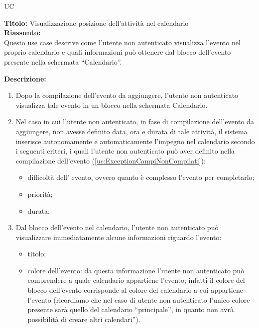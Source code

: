 \begin{listaPersonale}{UC}
    \begin{listaPersonale2} [UC] {}
        \textbf{Titolo:} Visualizzazione posizione dell'attività nel calendario \\
        \textbf{Riassunto: } \\
        Questo use case descrive come l'utente non autenticato visualizza l'evento nel proprio calendario e quali informazioni può ottenere dal blocco dell'evento presente nella schermata “Calendario”.

        \textbf{Descrizione: }
        \begin{enumerate}
            \item Dopo la compilazione dell'evento da aggiungere, l'utente non autenticato visualizza tale evento in un blocco nella schermata Calendario.
            \item Nel caso in cui l'utente non autenticato, in fase di compilazione dell'evento da aggiungere, non avesse definito data, ora e durata di tale attività, il sistema inserisce autonomamente e automaticamente l'impegno nel calendario secondo i seguenti criteri, i quali l'utente non autenticato può aver definito nella compilazione dell'evento (\ref{uc:ExceptionCampiNonCompilati}):
                  \begin{itemize}
                      \item difficoltà dell' evento, ovvero quanto è complesso l'evento per completarlo;
                      \item priorità;
                      \item durata;
                  \end{itemize}
            \item Dal blocco dell'evento nel calendario, l'utente non autenticato può visualizzare immediatamente alcune informazioni riguardo l'evento:
                  \begin{itemize}
                      \item titolo;
                      \item colore dell'evento: da questa informazione l'utente non autenticato può comprendere a quale calendario appartiene l'evento; infatti il colore del blocco dell'evento corrisponde al colore del calendario a cui appartiene l'evento (ricordiamo che nel caso di utente non autenticato l'unico colore presente sarà quello del calendario “principale”, in quanto non avrà possibilità di creare altri calendari”).

\end{itemize}
\end{enumerate}
\end{listaPersonale2}
\end{listaPersonale}
